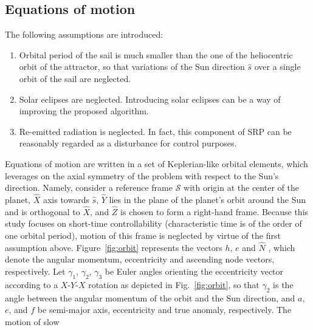 \documentclass[AMA,STIX1COL]{WileyNJD-v2}
\newcommand{\uvect}[1]{\hat{#1}}
\newcommand{\vect}[1]{#1}
\begin{document}
\subsection{Equations of motion}
\label{ssec:eom}
The following assumptions are introduced:
\begin{enumerate}
	\item Orbital period of the sail is much smaller than the one of the heliocentric orbit of the attractor, so that variations of the Sun direction $\uvect{s}$ over a single orbit of the sail are neglected.
	\item Solar eclipses are neglected. Introducing solar eclipses can be a way of improving the proposed algorithm.
	\item Re-emitted radiation is neglected. In fact, this component of \ac{SRP} can be reasonably regarded as a disturbance for control purposes.
	
\end{enumerate}
%
Equations of motion are written in a set of Keplerian-like orbital elements, which leverages on the axial symmetry of
the problem with respect to the Sun's direction. Namely, consider a reference frame $\mathcal{S}$ with origin at the center of
the planet, $\uvect{X}$ axis towards $\uvect{s}$, $\uvect{Y}$ lies in the plane of the planet's orbit around the Sun and
is orthogonal to $\uvect{X}$, and $\uvect{Z}$ is chosen to form a right-hand frame. Because this study focuses on
short-time controllability (characteristic time is of the order of one orbital period), motion of this frame is
neglected by virtue of the first assumption above. Figure~\ref{fig:orbit} represents the vectors $\vect{h}$, $\vect{e}$
and $\uvect{N}$ , which denote the angular momentum, eccentricity and ascending node vectors, respectively. Let
$\gamma_1$, $\gamma_2$, $\gamma_3$ be Euler angles orienting the eccentricity vector according to a $X$-$Y$-$X$ rotation
as depicted in Fig.~\ref{fig:orbit}, so that $\gamma_2$ is the angle between the angular momentum of the orbit and the
Sun direction, and $a$, $e$, and $f$ be semi-major axis, eccentricity and true anomaly, respectively. The motion of slow
\end{document}
